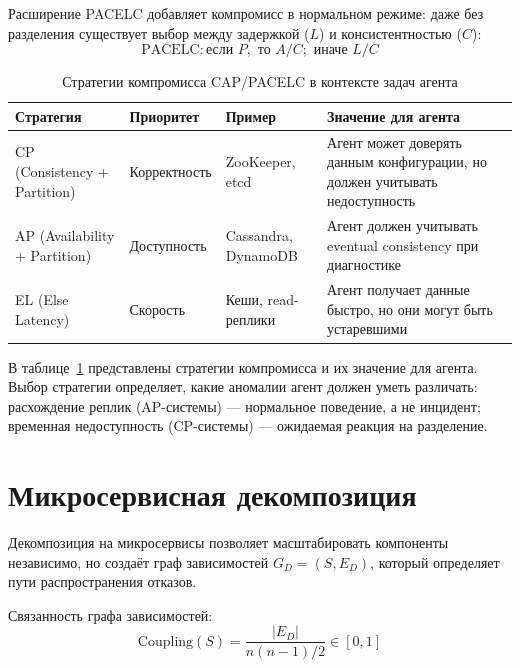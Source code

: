 Расширение PACELC \cite{abadi_pacelc} добавляет компромисс в нормальном режиме: даже без разделения существует выбор между задержкой ($L$) и консистентностью ($C$):
\begin{equation}
\text{PACELC}: \text{если } P, \text{ то } A/C; \text{ иначе } L/C
\label{eq:pacelc}
\end{equation}

\begin{table}[H]
\centering
\caption{Стратегии компромисса CAP/PACELC в контексте задач агента}
\label{tab:cap_strategies}
\setlength{\tabcolsep}{2pt}
\begin{tabularx}{\textwidth}{|p{3.5cm}|p{3cm}|p{3cm}|>{\raggedright\arraybackslash}X|}
\hline
\textbf{Стратегия} & \textbf{Приоритет} & \textbf{Пример} & \textbf{Значение для агента} \\
\hline
CP (Consistency + Partition) & Корректность & ZooKeeper, etcd & Агент может доверять данным конфигурации, но должен учитывать недоступность \\
\hline
AP (Availability + Partition) & Доступность & Cassandra, DynamoDB & Агент должен учитывать eventual consistency при диагностике \\
\hline
EL (Else Latency) & Скорость & Кеши, read-реплики & Агент получает данные быстро, но они могут быть устаревшими \\
\hline
\end{tabularx}
\end{table}

В таблице~\ref{tab:cap_strategies} представлены стратегии компромисса и их значение для агента. Выбор стратегии определяет, какие аномалии агент должен уметь различать: расхождение реплик (AP-системы) --- нормальное поведение, а не инцидент; временная недоступность (CP-системы) --- ожидаемая реакция на разделение.

\section{Микросервисная декомпозиция}

Декомпозиция на микросервисы \cite{newman_microservices,richardson_microservices_patterns,ieee_microservices} позволяет масштабировать компоненты независимо, но создаёт граф зависимостей $G_D = (S, E_D)$, который определяет пути распространения отказов.

Связанность графа зависимостей:
\begin{equation}
\text{Coupling}(S) = \frac{|E_D|}{n(n-1)/2} \in [0, 1]
\label{eq:coupling_metric}
\end{equation}

